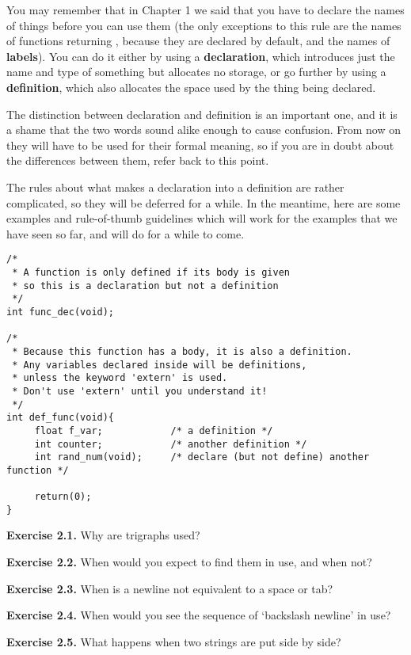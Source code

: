   

  You may remember that in Chapter 1 we said that you have to
   declare the names of things before you can use them (the only exceptions to
   this rule are the names of functions returning \kint, because
   they are declared by default, and the names of \textbf{labels}). You can
   do it either by using a \textbf{declaration}, which introduces just the
   name and type of something but allocates no storage, or go further by using
   a \textbf{definition}, which also allocates the space used by the thing
   being declared.


  The distinction between declaration and definition is an important one,
   and it is a shame that the two words sound alike enough to cause confusion.
   From now on they will have to be used for their formal meaning, so if you
   are in doubt about the differences between them, refer back to this
   point.


  The rules about what makes a declaration into a definition are rather
   complicated, so they will be deferred for a while. In the meantime, here
   are some examples and rule-of-thumb guidelines which will work for the
   examples that we have seen so far, and will do for a while to come.


  \begin{Verbatim}
/*
 * A function is only defined if its body is given
 * so this is a declaration but not a definition
 */
int func_dec(void);

/*
 * Because this function has a body, it is also a definition.
 * Any variables declared inside will be definitions,
 * unless the keyword 'extern' is used.
 * Don't use 'extern' until you understand it!
 */
int def_func(void){
     float f_var;            /* a definition */
     int counter;            /* another definition */
     int rand_num(void);     /* declare (but not define) another function */

     return(0);
}
\end{Verbatim}

  

   \textbf{Exercise 2.1.} Why are trigraphs used?


   \textbf{Exercise 2.2.} When would you expect to find them in use, and when
    not?


   \textbf{Exercise 2.3.} When is a newline not equivalent to a space or
    tab?


   \textbf{Exercise 2.4.} When would you see the sequence of `backslash
    newline' in use?


   \textbf{Exercise 2.5.} What happens when two strings are put side by
    side?


